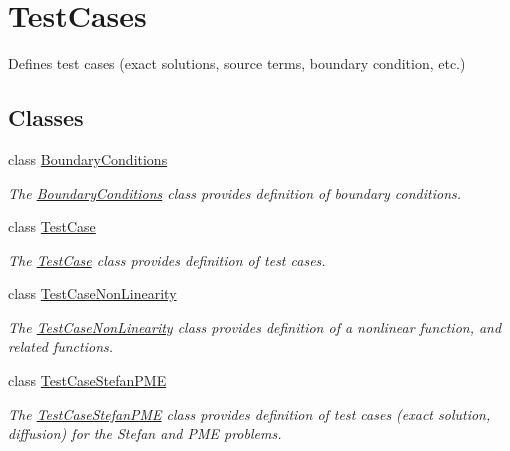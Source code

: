 \hypertarget{group__TestCases}{}\section{Test\+Cases}
\label{group__TestCases}


Defines test cases (exact solutions, source terms, boundary condition, etc.)  


\subsection*{Classes}
\begin{DoxyCompactItemize}
\item 
class \hyperlink{classBoundaryConditions}{Boundary\+Conditions}
\begin{DoxyCompactList}\small\item\em The \hyperlink{classBoundaryConditions}{Boundary\+Conditions} class provides definition of boundary conditions. \end{DoxyCompactList}\item 
class \hyperlink{classTestCase}{Test\+Case}
\begin{DoxyCompactList}\small\item\em The \hyperlink{classTestCase}{Test\+Case} class provides definition of test cases. \end{DoxyCompactList}\item 
class \hyperlink{classTestCaseNonLinearity}{Test\+Case\+Non\+Linearity}
\begin{DoxyCompactList}\small\item\em The \hyperlink{classTestCaseNonLinearity}{Test\+Case\+Non\+Linearity} class provides definition of a nonlinear function, and related functions. \end{DoxyCompactList}\item 
class \hyperlink{classTestCaseStefanPME}{Test\+Case\+Stefan\+P\+ME}
\begin{DoxyCompactList}\small\item\em The \hyperlink{classTestCaseStefanPME}{Test\+Case\+Stefan\+P\+ME} class provides definition of test cases (exact solution, diffusion) for the Stefan and P\+ME problems. \end{DoxyCompactList}\end{DoxyCompactItemize}
